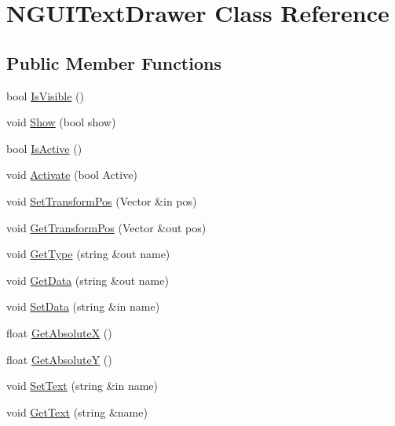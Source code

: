 \hypertarget{class_n_g_u_i_text_drawer}{}\section{N\+G\+U\+I\+Text\+Drawer Class Reference}
\label{class_n_g_u_i_text_drawer}
\subsection*{Public Member Functions}
\begin{DoxyCompactItemize}
\item 
bool \hyperlink{class_n_g_u_i_text_drawer_a3c91971b50a71a36e461fed2d7e5ce37}{Is\+Visible} ()
\item 
void \hyperlink{class_n_g_u_i_text_drawer_a80ecbfada6e99304c0068187eacf8a32}{Show} (bool show)
\item 
bool \hyperlink{class_n_g_u_i_text_drawer_a42247131d939c6430d4563f164eb4632}{Is\+Active} ()
\item 
void \hyperlink{class_n_g_u_i_text_drawer_a03c4b039baeef77accfb60a7d976f58b}{Activate} (bool Active)
\item 
void \hyperlink{class_n_g_u_i_text_drawer_ad865297363a8cb996897bca6c9169ac0}{Set\+Transform\+Pos} (Vector \&in pos)
\item 
void \hyperlink{class_n_g_u_i_text_drawer_aea82a7429de25bffcbfb2eb6abba3961}{Get\+Transform\+Pos} (Vector \&out pos)
\item 
void \hyperlink{class_n_g_u_i_text_drawer_a9c582a2297409366529791457ba464d3}{Get\+Type} (string \&out name)
\item 
void \hyperlink{class_n_g_u_i_text_drawer_a59a384f8f0d3bb153f498d9c6581c8a0}{Get\+Data} (string \&out name)
\item 
void \hyperlink{class_n_g_u_i_text_drawer_a7b8e0e5be61cbaadfe21c51776dc3a6b}{Set\+Data} (string \&in name)
\item 
float \hyperlink{class_n_g_u_i_text_drawer_a49901b5477d8ec4f63d1c913234e4e59}{Get\+AbsoluteX} ()
\item 
float \hyperlink{class_n_g_u_i_text_drawer_a7aae9ac2ea637f26e10830bdf6136304}{Get\+AbsoluteY} ()
\item 
void \hyperlink{class_n_g_u_i_text_drawer_aaa874f4fdf507ec6fdefee0f5d93d3a7}{Set\+Text} (string \&in name)
\item 
void \hyperlink{class_n_g_u_i_text_drawer_a9d25a99321c520f17606859a76e886b7}{Get\+Text} (string \&name)
\item 

\end{DoxyCompactItemize}
